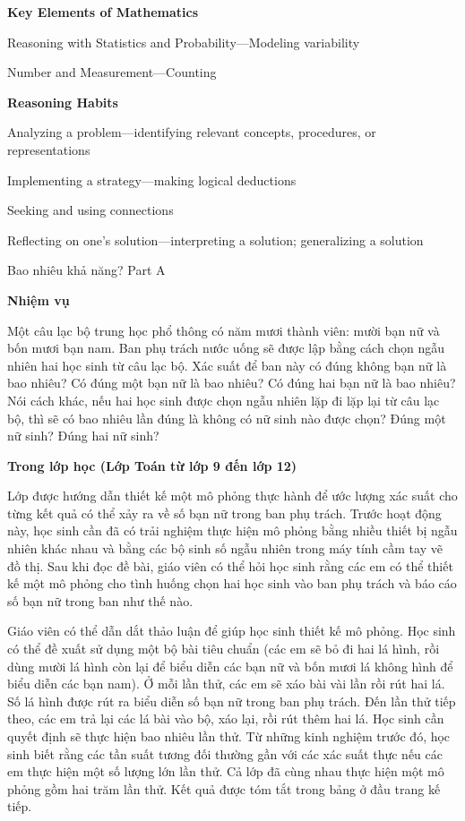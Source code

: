 \documentclass[
  10pt,
  a4paper,
  landscape,
  twoside,
  openany
]{scrbook}
\begin{document}
{\noindent
\textbf{Key Elements of Mathematics}

Reasoning with Statistics and Probability---Modeling variability

Number and Measurement---Counting

\noindent
\textbf{Reasoning Habits}

Analyzing a problem---identifying relevant concepts, procedures, or representations

Implementing a strategy---making logical deductions

Seeking and using connections

Reflecting on one's solution---interpreting a solution; generalizing a solution
}
{Bao nhiêu khả năng? Part A}
{
\noindent
\textbf{Nhiệm vụ}

Một câu lạc bộ trung học phổ thông có năm mươi thành viên: mười bạn nữ và bốn mươi bạn nam. Ban phụ trách nước uống sẽ được lập bằng cách chọn ngẫu nhiên hai học sinh từ câu lạc bộ. Xác suất để ban này có đúng không bạn nữ là bao nhiêu? Có đúng một bạn nữ là bao nhiêu? Có đúng hai bạn nữ là bao nhiêu? Nói cách khác, nếu hai học sinh được chọn ngẫu nhiên lặp đi lặp lại từ câu lạc bộ, thì sẽ có bao nhiêu lần đúng là không có nữ sinh nào được chọn? Đúng một nữ sinh? Đúng hai nữ sinh?

\noindent
\textbf{Trong lớp học (Lớp Toán từ lớp 9 đến lớp 12)}

Lớp được hướng dẫn thiết kế một mô phỏng thực hành để ước lượng xác suất cho từng kết quả có thể xảy ra về số bạn nữ trong ban phụ trách. Trước hoạt động này, học sinh cần đã có trải nghiệm thực hiện mô phỏng bằng nhiều thiết bị ngẫu nhiên khác nhau và bằng các bộ sinh số ngẫu nhiên trong máy tính cầm tay vẽ đồ thị. Sau khi đọc đề bài, giáo viên có thể hỏi học sinh rằng các em có thể thiết kế một mô phỏng cho tình huống chọn hai học sinh vào ban phụ trách và báo cáo số bạn nữ trong ban như thế nào.

Giáo viên có thể dẫn dắt thảo luận để giúp học sinh thiết kế mô phỏng. Học sinh có thể đề xuất sử dụng một bộ bài tiêu chuẩn (các em sẽ bỏ đi hai lá hình, rồi dùng mười lá hình còn lại để biểu diễn các bạn nữ và bốn mươi lá không hình để biểu diễn các bạn nam). Ở mỗi lần thử, các em sẽ xáo bài vài lần rồi rút hai lá. Số lá hình được rút ra biểu diễn số bạn nữ trong ban phụ trách. Đến lần thử tiếp theo, các em trả lại các lá bài vào bộ, xáo lại, rồi rút thêm hai lá. Học sinh cần quyết định sẽ thực hiện bao nhiêu lần thử. Từ những kinh nghiệm trước đó, học sinh biết rằng các tần suất tương đối thường gần với các xác suất thực nếu các em thực hiện một số lượng lớn lần thử. Cả lớp đã cùng nhau thực hiện một mô phỏng gồm hai trăm lần thử. Kết quả được tóm tắt trong bảng ở đầu trang kế tiếp.

}
\end{document}
